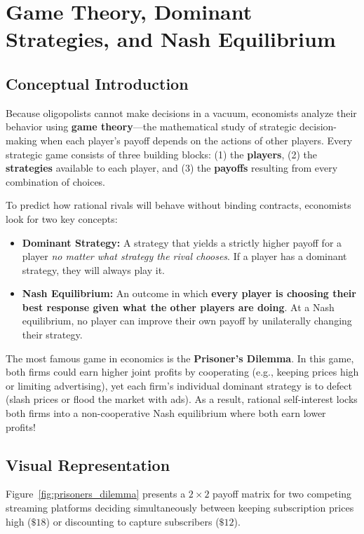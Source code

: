 \documentclass[11pt,letterpaper]{article}
\begin{document}
\section{Game Theory, Dominant Strategies, and Nash Equilibrium}

\subsection*{Conceptual Introduction}
Because oligopolists cannot make decisions in a vacuum, economists analyze their behavior using \textbf{game theory}—the mathematical study of strategic decision-making when each player's payoff depends on the actions of other players. Every strategic game consists of three building blocks: (1) the \textbf{players}, (2) the \textbf{strategies} available to each player, and (3) the \textbf{payoffs} resulting from every combination of choices.

To predict how rational rivals will behave without binding contracts, economists look for two key concepts:
\begin{itemize}
    \item \textbf{Dominant Strategy:} A strategy that yields a strictly higher payoff for a player \emph{no matter what strategy the rival chooses}. If a player has a dominant strategy, they will always play it.
    \item \textbf{Nash Equilibrium:} An outcome in which \textbf{every player is choosing their best response given what the other players are doing}. At a Nash equilibrium, no player can improve their own payoff by unilaterally changing their strategy.
\end{itemize}

The most famous game in economics is the \textbf{Prisoner's Dilemma}. In this game, both firms could earn higher joint profits by cooperating (e.g., keeping prices high or limiting advertising), yet each firm's individual dominant strategy is to defect (slash prices or flood the market with ads). As a result, rational self-interest locks both firms into a non-cooperative Nash equilibrium where both earn lower profits!

\subsection*{Visual Representation}
Figure~\ref{fig:prisoners_dilemma} presents a $2 \times 2$ payoff matrix for two competing streaming platforms deciding simultaneously between keeping subscription prices high ($\$18$) or discounting to capture subscribers ($\$12$).
\end{document}
